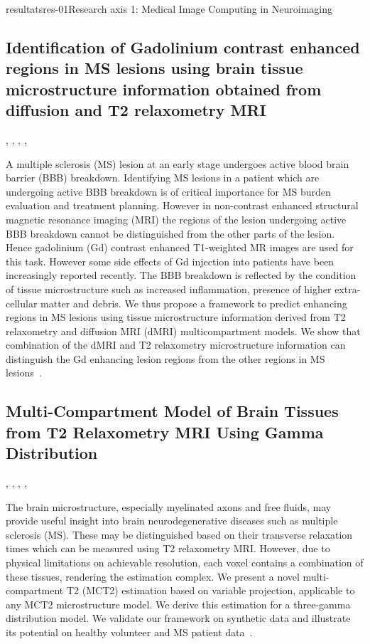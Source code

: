 \documentclass{ra2018}
\begin{document}
\begin{module}{resultats}{res-01}{Research axis 1: Medical Image Computing in Neuroimaging}
\subsection{Identification of Gadolinium contrast enhanced regions in MS lesions using brain tissue microstructure information obtained from diffusion and T2 relaxometry MRI}
\begin{participants}
      , 
      ,
      ,
      ,
\end{participants}
A multiple sclerosis (MS) lesion at an early stage undergoes active blood brain barrier (BBB) breakdown. Identifying MS lesions in a patient which are undergoing active BBB breakdown is of critical importance for MS burden evaluation and treatment planning. However in non-contrast enhanced structural magnetic resonance imaging (MRI) the regions of the lesion undergoing active BBB breakdown cannot be distinguished from the other parts of the lesion. Hence gadolinium (Gd) contrast enhanced T1-weighted MR images are used for this task. However some side effects of Gd injection into patients have been increasingly reported recently. The BBB breakdown is reflected by the condition of tissue microstructure such as increased inflammation, presence of higher extra-cellular matter and debris. We thus propose a framework to predict enhancing regions in MS lesions using tissue microstructure information derived from T2 relaxometry and diffusion MRI (dMRI) multicompartment models. We show that combination of the dMRI and T2 relaxometry microstructure information can distinguish the Gd enhancing lesion regions from the other regions in MS lesions~\cite{chatterjee:hal-01830532}.


\subsection{Multi-Compartment Model of Brain Tissues from T2 Relaxometry MRI Using Gamma Distribution}
\begin{participants}
      , 
      ,
      ,
      ,
\end{participants}
The brain microstructure, especially myelinated axons and free fluids, may provide useful insight into brain neurodegenerative diseases such as multiple sclerosis (MS). These may be distinguished based on their transverse relaxation times which can be measured using T2 relaxometry MRI. However, due to physical limitations on achievable resolution, each voxel contains a combination of these tissues, rendering the estimation complex. We present a novel multi-compartment T2 (MCT2) estimation based on variable projection, applicable to any MCT2 microstructure model. We derive this estimation for a three-gamma distribution model. We validate our framework on synthetic data and illustrate its potential on healthy volunteer and MS patient data~\cite{chatterjee:hal-01744852}.


\end{module}
\end{document}
